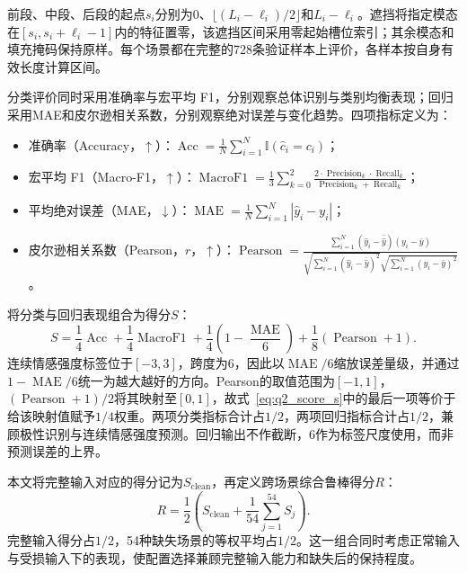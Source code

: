 \documentclass[UTF8,a4paper,11pt]{ctexart}
\newcommand{\QTwoParagraph}{\par\noindent\hspace*{2em}}
\newcounter{q2algorithm}
\begin{document}
\QTwoParagraph 前段、中段、后段的起点$s_i$分别为$0$、$\lfloor(L_i-\ell_i)/2\rfloor$和$L_i-\ell_i$。遮挡将指定模态在$[s_i,s_i+\ell_i-1]$内的特征置零，该遮挡区间采用零起始槽位索引；其余模态和填充掩码保持原样。每个场景都在完整的728条验证样本上评价，各样本按自身有效长度计算区间。

\QTwoParagraph 分类评价同时采用准确率与宏平均 F1，分别观察总体识别与类别均衡表现；回归采用MAE和皮尔逊相关系数，分别观察绝对误差与变化趋势。四项指标定义为：
\begin{itemize}[leftmargin=2.5em,itemsep=0pt,topsep=2pt]
  \item 准确率（Accuracy，$\uparrow$）：$\operatorname{Acc} = \frac{1}{N}\sum_{i=1}^N \mathbb I(\hat c_i = c_i)$；
  \item 宏平均 F1（Macro-F1，$\uparrow$）：$\operatorname{MacroF1} = \frac{1}{3}\sum_{k=0}^2 \frac{2 \cdot \operatorname{Precision}_k \cdot \operatorname{Recall}_k}{\operatorname{Precision}_k + \operatorname{Recall}_k}$；
  \item 平均绝对误差（MAE，$\downarrow$）：$\operatorname{MAE} = \frac{1}{N}\sum_{i=1}^N |\hat y_i - y_i|$；
  \item 皮尔逊相关系数（Pearson，$r$，$\uparrow$）：$\operatorname{Pearson} = \frac{\sum_{i=1}^N (\hat y_i - \bar{\hat y})(y_i - \bar y)}{\sqrt{\sum_{i=1}^N (\hat y_i - \bar{\hat y})^2}\sqrt{\sum_{i=1}^N (y_i - \bar y)^2}}$。
\end{itemize}

\QTwoParagraph 将分类与回归表现组合为得分$S$：
\begin{equation}
S = \frac{1}{4}\operatorname{Acc} + \frac{1}{4}\operatorname{MacroF1} + \frac{1}{4}\left(1 - \frac{\operatorname{MAE}}{6}\right) + \frac{1}{8}(\operatorname{Pearson} + 1).
\label{eq:q2_score_s}
\end{equation}
连续情感强度标签位于$[-3,3]$，跨度为6，因此以$\operatorname{MAE}/6$缩放误差量级，并通过$1-\operatorname{MAE}/6$统一为越大越好的方向。Pearson的取值范围为$[-1,1]$，$(\operatorname{Pearson}+1)/2$将其映射至$[0,1]$，故式~\eqref{eq:q2_score_s}中的最后一项等价于给该映射值赋予$1/4$权重。两项分类指标合计占$1/2$，两项回归指标合计占$1/2$，兼顾极性识别与连续情感强度预测。回归输出不作截断，6作为标签尺度使用，而非预测误差的上界。

\QTwoParagraph 本文将完整输入对应的得分记为$S_{\mathrm{clean}}$，再定义跨场景综合鲁棒得分$R$：
\begin{equation}
R = \frac{1}{2}\left(S_{\mathrm{clean}} + \frac{1}{54}\sum_{j=1}^{54} S_j\right).
\label{eq:q2_robust_r}
\end{equation}
完整输入得分占$1/2$，54种缺失场景的等权平均占$1/2$。这一组合同时考虑正常输入与受损输入下的表现，使配置选择兼顾完整输入能力和缺失后的保持程度。
\end{document}
